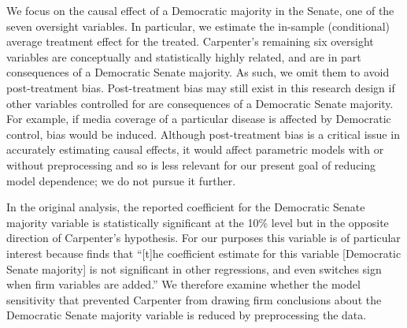 \documentclass[11pt,titlepage]{article}
\begin{document}
We focus on the causal effect of a Democratic majority in the Senate,
one of the seven oversight variables. In particular, we estimate the
in-sample (conditional) average treatment effect for the treated.
Carpenter's remaining six oversight variables are conceptually and
statistically highly related, and are in part consequences of a
Democratic Senate majority.  As such, we omit them to avoid
post-treatment bias.  Post-treatment bias may still exist in this
research design if other variables controlled for are consequences of
a Democratic Senate majority.  For example, if media coverage of a
particular disease is affected by Democratic control, bias would be
induced.  Although post-treatment bias is a critical issue in
accurately estimating causal effects, it would affect parametric
models with or without preprocessing and so is less relevant for our
present goal of reducing model dependence; we do not pursue it
further.


In the original analysis, the reported coefficient for the Democratic
Senate majority variable is statistically significant at the 10\%
level but in the opposite direction of Carpenter's hypothesis.  For
our purposes this variable is of particular interest because
\citet[p.498]{Carpenter02} finds that ``[t]he coefficient estimate for
this variable [Democratic Senate majority] is not significant in other
regressions, and even switches sign when firm variables are added.''
We therefore examine whether the model sensitivity that prevented
Carpenter from drawing firm conclusions about the Democratic Senate
majority variable is reduced by preprocessing the data. 
\end{document}
